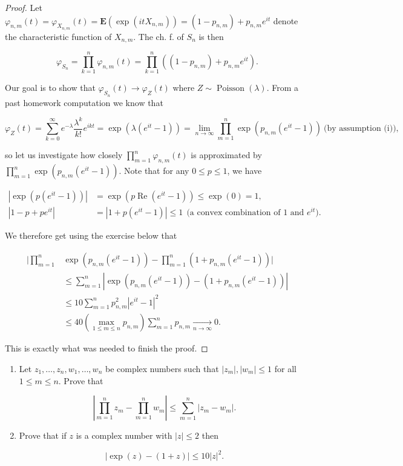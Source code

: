 \begin{proof}
Let
$\varphi_{n,m}(t)=\varphi_{X_{n,m}}(t)=\mathbf{E}(\exp(it
X_{n,m})) = (1-p_{n,m})+p_{n,m}e^{it}$
denote the characteristic function of $X_{n,m}$. The
ch. f. of $S_n$ is then

\[
\varphi_{S_n} = \prod_{k=1}^n \varphi_{n,m}(t) = \prod_{k=1}^n \left((1-p_{n,m})+p_{n,m}e^{it}\right).
\]

\noindent Our goal is to show that
$\varphi_{S_n}(t)\to \varphi_Z(t)$ where
$Z\sim \operatorname{Poisson}(\lambda)$. From a past
homework computation we know that

\[
\varphi_Z(t) = \sum_{k=0}^\infty e^{-\lambda} \frac{\lambda^k}{k!} e^{ikt} =\exp(\lambda(e^{it}-1)) = \lim_{n\to\infty} \prod_{m=1}^n \exp(p_{n,m}(e^{it}-1))
 \ \textrm{(by assumption (i)),}
\]

\noindent so let us investigate how closely
$\prod_{m=1}^n\varphi_{n,m}(t)$ is approximated by
$\prod_{m=1}^n\exp(p_{n,m}(e^{it}-1))$. Note that for
any $0\le p\le 1$, we have

\begin{align*}
|\exp(p(e^{it}-1))| &= \exp(p \operatorname{Re}(e^{it}-1)) \le \exp(0)=1, \\
|1-p+pe^{it}| &= |1+p(e^{it}-1)| \le 1 \ \ \textrm{(a convex combination of $1$ and $e^{it}$)}.
\end{align*}

\noindent We therefore get using the exercise below that

\begin{align*}
\Bigg| \prod_{m=1}^n &\exp\left(p_{n,m}(e^{it}-1)\right)-\prod_{m=1}^n (1+p_{n,m}(e^{it}-1))\Bigg| \\ &
\le \sum_{m=1}^n |\exp\left(p_{n,m}(e^{it}-1)\right)-(1+p_{n,m}(e^{it}-1))| \\
&\le 10\sum_{m=1}^n p_{n,m}^2 |e^{it}-1|^2 \\
&\le 40\left(\max_{1\le m\le n} p_{n,m}\right) \sum_{m=1}^n p_{n,m} \xrightarrow[n\to\infty]{} 0.
\end{align*}

\noindent This is exactly what was needed to finish the proof.
\end{proof}

\begin{xexercise}

\begin{enumerate}[label=(\roman*)]
\item Let $z_1,\ldots,z_n, w_1,\ldots, w_n$ be complex
numbers such that $|z_m|, |w_m|\le 1$ for all
$1\le m\le n$. Prove that

\[
\left|\prod_{m=1}^n z_m - \prod_{m=1}^n w_m \right| \le \sum_{m=1}^n |z_m-w_m|.
\]

\item Prove that if $z$ is a complex number with $|z|\le 2$
then

\[
|\exp(z)-(1+z)| \le 10 |z|^2.
\]
\end{enumerate}

\end{xexercise}
